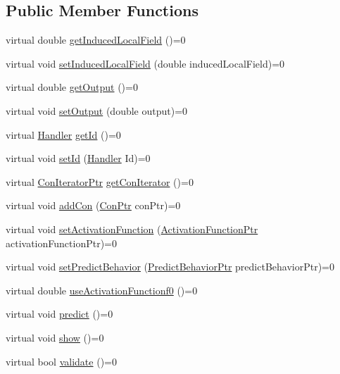 \subsection*{Public Member Functions}
\begin{DoxyCompactItemize}
\item 
virtual double \hyperlink{class_neuron_a1b7eea569128502e3387f5b50751a119}{getInducedLocalField} ()=0
\item 
virtual void \hyperlink{class_neuron_ab7244964f798eb9cace1cb916f5ef359}{setInducedLocalField} (double inducedLocalField)=0
\item 
virtual double \hyperlink{class_neuron_a43ac0c8461c610bb2b82017d597435e3}{getOutput} ()=0
\item 
virtual void \hyperlink{class_neuron_aae94f78cfa7ed3ce4935f23a3a585f95}{setOutput} (double output)=0
\item 
virtual \hyperlink{_a_m_o_r_e_8h_abc871abb71cff6655b8172ee7240b8ef}{Handler} \hyperlink{class_neuron_a1a34edd39fba70be1d18219d5e9e1eea}{getId} ()=0
\item 
virtual void \hyperlink{class_neuron_a65331c891ac34a344d0bb791073a8dd9}{setId} (\hyperlink{_a_m_o_r_e_8h_abc871abb71cff6655b8172ee7240b8ef}{Handler} Id)=0
\item 
virtual \hyperlink{_a_m_o_r_e_8h_a819efaf710ead601ac8241df5e235dd8}{ConIteratorPtr} \hyperlink{class_neuron_ac52554d6ba02e8eec2dd04a150169ec9}{getConIterator} ()=0
\item 
virtual void \hyperlink{class_neuron_a9b991901b252c50c76b5192e2d135c68}{addCon} (\hyperlink{_a_m_o_r_e_8h_a169bb8e5f26ce70bf2b10dec2fb5ee50}{ConPtr} conPtr)=0
\item 
virtual void \hyperlink{class_neuron_ab73922d2dba9f86ab192e2bb87c6a1aa}{setActivationFunction} (\hyperlink{_a_m_o_r_e_8h_a77602a0277a02e5769c3df0adc669b17}{ActivationFunctionPtr} activationFunctionPtr)=0
\item 
virtual void \hyperlink{class_neuron_af21848d0ef33bec5587e4c2702c83e3f}{setPredictBehavior} (\hyperlink{_a_m_o_r_e_8h_a1fb2f1f8fdf1e08c42ef4bdce436af93}{PredictBehaviorPtr} predictBehaviorPtr)=0
\item 
virtual double \hyperlink{class_neuron_a78c90ab1f5d18b2d7cb8f366391b7821}{useActivationFunctionf0} ()=0
\item 
virtual void \hyperlink{class_neuron_a7181d8d0a5f9b0e4ff39410785f087e9}{predict} ()=0
\item 
virtual void \hyperlink{class_neuron_ae18a86f9b67c63a6fcb28c813b47a38d}{show} ()=0
\item 
virtual bool \hyperlink{class_neuron_a37f57f44fefa328ea0b7ab32b52c853e}{validate} ()=0
\end{DoxyCompactItemize}
